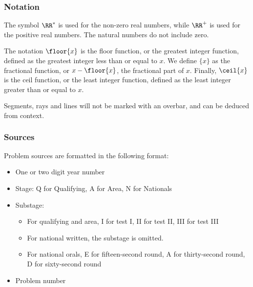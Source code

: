 \documentclass[10pt,paper=letter]{scrartcl}
\begin{document}
\subsubsection*{Notation}

The symbol $\RR^*$ is used for the non-zero real numbers, while $\RR^+$ is used for the positive real numbers. The natural numbers do not include zero.

The notation $\floor{x}$ is the floor function, or the greatest integer function, defined as the greatest integer less than or equal to $x$. We define $\{x\}$ as the fractional function, or $x - \floor{x}$, the fractional part of $x$. Finally, $\ceil{x}$ is the ceil function, or the least integer function, defined as the least integer greater than or equal to $x$.

Segments, rays and lines will not be marked with an overbar, and can be deduced from context.

\subsubsection*{Sources}

Problem sources are formatted in the following format:

\begin{itemize}

\item One or two digit year number

\item Stage: Q for Qualifying, A for Area, N for Nationals

\item Substage:

\begin{itemize}

\item For qualifying and area, I for test I, II for test II, III for test III

\item For national written, the substage is omitted.

\item For national orals, E for fifteen-second round, A for thirty-second round, D for sixty-second round

\end{itemize}

\item Problem number

\end{itemize}
\end{document}

